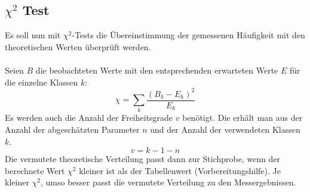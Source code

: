 \documentclass[a4paper,titlepage]{scrartcl}
\numberwithin{equation}{section}
\begin{document}
\subsection{$\chi^2$ Test}
Es soll nun mit $\chi^2$-Tests die Übereinstimmung der gemessenen Häufigkeit mit den theoretischen Werten überprüft werden.\\ \\
Seien $B$ die beobachteten Werte mit den entsprechenden erwarteten Werte $E$ für die einzelne Klassen $k$:
\begin{equation*}
\chi=\sum_k \frac{(B_k-E_k)^2}{E_k}
\end{equation*}
Es werden auch die Anzahl der Freiheitsgrade $v$ benötigt. Die erhält man aus der Anzahl der abgeschätzten Parameter $n$ und der Anzahl der verwendeten Klassen $k$.
\begin{equation*}
v=k-1-n
\end{equation*}
Die vermutete theoretische Verteilung passt dann zur Stichprobe, wenn der berechnete Wert $\chi^2$ kleiner ist als der Tabellenwert (Vorbereitungshilfe). Je kleiner $\chi^2$, umso besser passt die vermutete Verteilung zu den Messergebnissen.
\end{document}
